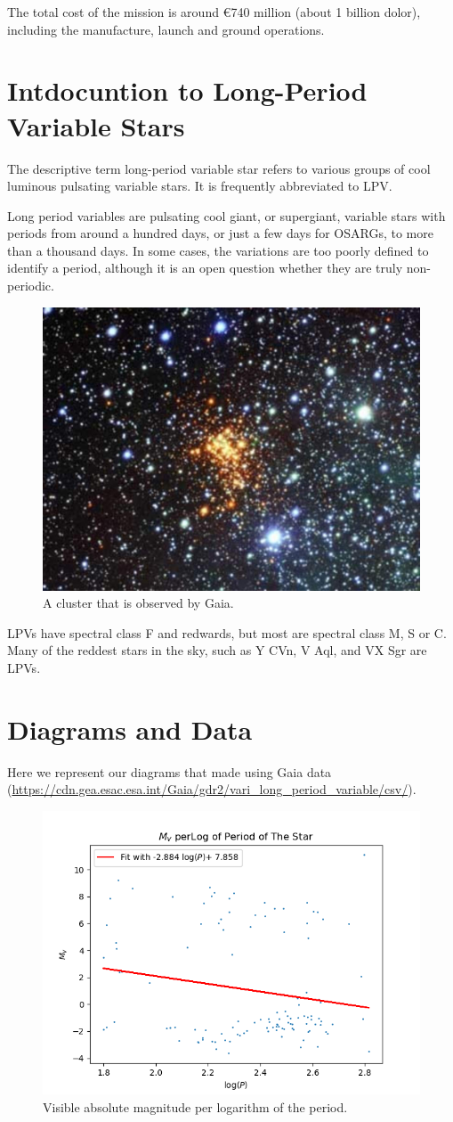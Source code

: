 \documentclass[12pt,a4paper]{article}
\begin{document}
	The total cost of the mission is around €740 million (about 1 billion dolor), including the manufacture, launch and ground operations.
	
	\section*{Intdocuntion to Long-Period Variable Stars}
	
	The descriptive term long-period variable star refers to various groups of cool luminous pulsating variable stars. It is frequently abbreviated to LPV.
	
	Long period variables are pulsating cool giant, or supergiant, variable stars with periods from around a hundred days, or just a few days for OSARGs, to more than a thousand days. In some cases, the variations are too poorly defined to identify a period, although it is an open question whether they are truly non-periodic.
	\begin{figure}[ht]
		\centering
		\caption{A cluster that is observed by Gaia.}
		\includegraphics[width=0.7\linewidth]{cluster.png}
	\end{figure}
	LPVs have spectral class F and redwards, but most are spectral class M, S or C. Many of the reddest stars in the sky, such as Y CVn, V Aql, and VX Sgr are LPVs.
	
	\section*{Diagrams and Data}
	Here we represent our diagrams that made using Gaia data (\url{https://cdn.gea.esac.esa.int/Gaia/gdr2/vari_long_period_variable/csv/}).
	\begin{figure}[ht]
		\centering
		\caption{Visible absolute magnitude per logarithm of the period.}
		\includegraphics[width=0.6\linewidth]{Mv_s_per_log(P).png}
	\end{figure}
\end{document}
